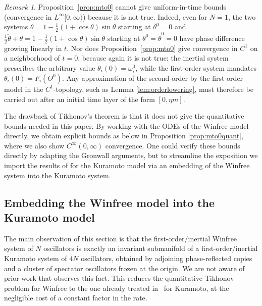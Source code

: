 \documentclass[11pt,reqno]{amsart}
\theoremstyle{definition}
\theoremstyle{remark}
\newtheorem{remark}[lemma]{Remark}
\begin{document}
\begin{remark}
Proposition~\ref{prop:mto0} cannot give uniform-in-time bounds
(convergence in $L^\infty[0,\infty)$) because it is not true. Indeed, even for $N=1$, the two
systems $\dot\theta=1-\tfrac12(1+\cos\theta)\sin\theta$ starting at $\theta^0=0$ and
$\tfrac12\ddot\theta+\dot\theta=1-\tfrac12(1+\cos\theta)\sin\theta$
starting at $\theta^0=\dot\theta^0=0$ have phase difference growing
linearly in $t$. Nor does Proposition~\ref{prop:mto0} give convergence in $C^1$ on a
neighborhood of $t=0$, because again it is not true: the inertial system prescribes the arbitrary
value $\dot\theta_i(0)=\omega_i^0$, while the first-order system
mandates $\dot\theta_i(0)=F_i(\Theta^0)$. Any approximation of the
second-order by the first-order model in the $C^1$-topology, such as Lemma \ref{lem:orderlowering}, must
therefore be carried out after an initial time layer of the form
$[0,\eta m]$.
\end{remark}

The drawback of Tikhonov's theorem is that it does not give the quantitative bounds needed in this paper. By working with the ODEs of the Winfree model directly, we obtain explicit bounds as below in Proposition \ref{prop:mto0quant}, where we also show $C^\infty(0,\infty)$ convergence. One could verify these bounds directly by adapting the Gronwall arguments, but to streamline the exposition we import the results of \cite{cho2025inertia} for the Kuramoto model via an embedding of the Winfree system into the Kuramoto system.



\subsection{Embedding the Winfree model into the Kuramoto model}
\label{subsec:embedding}

The main observation of this section is that the first-order/inertial Winfree
system of $N$ oscillators is exactly an invariant submanifold of a
first-order/inertial Kuramoto system of $4N$ oscillators, obtained by adjoining
phase-reflected copies and a cluster of spectator oscillators frozen
at the origin. We are not aware of prior work that observes this fact. This reduces the quantitative Tikhonov problem for
Winfree to the one already treated in~\cite{cho2025inertia} for
Kuramoto, at the negligible cost of a constant factor in the rate.
\end{document}
